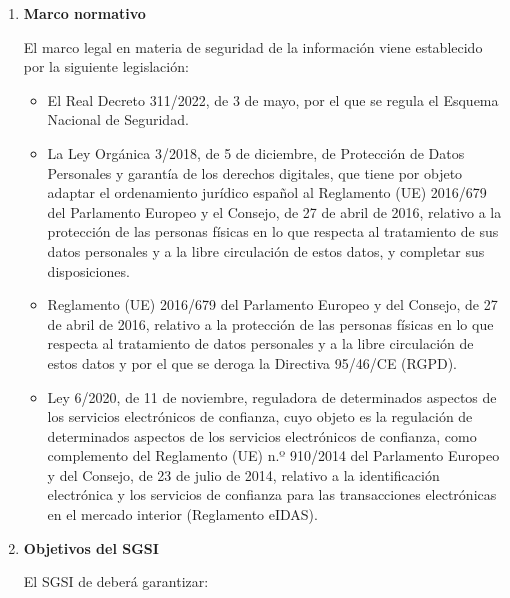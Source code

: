 \begin{enumerate}[label=\alph*)]
\item \textbf{Marco normativo}

El marco legal en materia de seguridad de la información viene establecido por la siguiente legislación:

\begin{itemize}
    \item El Real Decreto 311/2022, de 3 de mayo, por el que se regula el Esquema Nacional de Seguridad.
    \item La Ley Orgánica 3/2018, de 5 de diciembre, de Protección de Datos Personales y garantía de los derechos digitales, que tiene por objeto adaptar el ordenamiento jurídico español al Reglamento (UE) 2016/679 del Parlamento Europeo y el Consejo, de 27 de abril de 2016, relativo a la protección de las personas físicas en lo que respecta al tratamiento de sus datos personales y a la libre circulación de estos datos, y completar sus disposiciones.
    \item Reglamento (UE) 2016/679 del Parlamento Europeo y del Consejo, de 27 de abril de 2016, relativo a la protección de las personas físicas en lo que respecta al tratamiento de datos personales y a la libre circulación de estos datos y por el que se deroga la Directiva 95/46/CE (RGPD).
    \item Ley 6/2020, de 11 de noviembre, reguladora de determinados aspectos de los servicios electrónicos de confianza, cuyo objeto es la regulación de determinados aspectos de los servicios electrónicos de confianza, como complemento del Reglamento (UE) n.º 910/2014 del Parlamento Europeo y del Consejo, de 23 de julio de 2014, relativo a la identificación electrónica y los servicios de confianza para las transacciones electrónicas en el mercado interior (Reglamento eIDAS).
\end{itemize}

\item \textbf{Objetivos del SGSI}

El SGSI de \Beneficiario deberá garantizar:


\end{enumerate}
